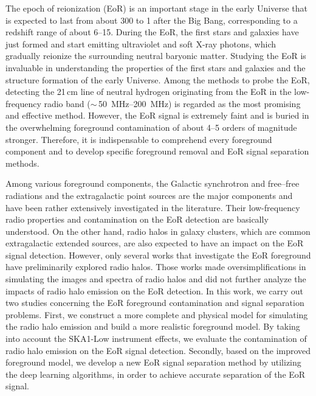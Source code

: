 \begin{englishabstract}

The epoch of reionization (EoR) is an important stage in the early
Universe that is expected to last from about \SI{300}{\Myr} to
\SI{1}{\Gyr} after the Big Bang, corresponding to a redshift range of
about 6--15.
During the EoR, the first stars and galaxies have just formed and
start emitting ultraviolet and soft X-ray photons,
which gradually reionize the surrounding neutral baryonic matter.
Studying the EoR is invaluable in understanding the properties of the
first stars and galaxies and the structure formation of the early
Universe.
Among the methods to probe the EoR, detecting the 21\,cm line of
neutral hydrogen originating from the EoR in the low-frequency
radio band ($\sim$\,\SIrange{50}{200}{\MHz}) is regarded as
the most promising and effective method.
However, the EoR signal is extremely faint and is buried in the
overwhelming foreground contamination of about 4--5 orders of magnitude
stronger.
Therefore, it is indispensable to comprehend every foreground
component and to develop specific foreground removal and EoR signal
separation methods.

Among various foreground components, the Galactic synchrotron and
free--free radiations and the extragalactic point sources are the
major components and have been rather extensively investigated in
the literature.
Their low-frequency radio properties and contamination on the EoR
detection are basically understood.
On the other hand, radio halos in galaxy clusters, which are common
extragalactic extended sources, are also expected to have an impact on
the EoR signal detection.
However, only several works that investigate the EoR foreground
have preliminarily explored radio halos.
Those works made oversimplifications in simulating the images and
spectra of radio halos and did not further analyze the impacts of
radio halo emission on the EoR detection.
In this work, we carry out two studies concerning the EoR foreground
contamination and signal separation problems.
First, we construct a more complete and physical model for simulating
the radio halo emission and build a more realistic foreground model.
By taking into account the SKA1-Low instrument effects, we evaluate
the contamination of radio halo emission on the EoR signal detection.
Secondly, based on the improved foreground model, we develop a new EoR
signal separation method by utilizing the deep learning algorithms,
in order to achieve accurate separation of the EoR signal.


\end{englishabstract}
